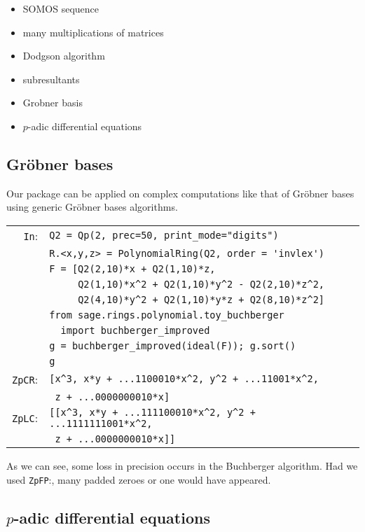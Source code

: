 \documentclass[sigconf]{acmart}
\newcommand{\cIn}{{\color{blue} \tt \phantom{Zp}In}:}
\newcommand{\cZpCR}{{\color{red} \tt ZpCR}:}
\newcommand{\cZpFP}{{\color{red} \tt ZpFP}:}
\newcommand{\cZpLC}{{\color{red} \tt ZpLC}:}
\theoremstyle{definition}
\begin{document}
\begin{itemize}
\item SOMOS sequence
\item many multiplications of matrices
\item Dodgson algorithm
\item subresultants
\item Grobner basis
\item $p$-adic differential equations
\end{itemize}

\subsection{Gröbner bases}
Our package can be applied 
on complex computations like that of
Gröbner bases using generic
Gröbner bases algorithms.

\begin{tabular}{rl}
\cIn
 & \verb?Q2 = Qp(2, prec=50, print_mode="digits")? \\
 & \verb?R.<x,y,z> = PolynomialRing(Q2, order = 'invlex')? \\
 & \verb?F = [Q2(2,10)*x + Q2(1,10)*z, ? \\
 & \verb?     Q2(1,10)*x^2 + Q2(1,10)*y^2 - Q2(2,10)*z^2,? \\
 & \verb?     Q2(4,10)*y^2 + Q2(1,10)*y*z + Q2(8,10)*z^2]? \\
 & \verb?from sage.rings.polynomial.toy_buchberger?\\
 &\verb?  import buchberger_improved? \\
 & \verb?g = buchberger_improved(ideal(F)); g.sort()? \\
 & \verb?g? \\
\cZpCR
 & \verb?[x^3, x*y + ...1100010*x^2, y^2 + ...11001*x^2,? \\
 & \verb? z + ...0000000010*x]? \\
\cZpLC
 & \verb?[[x^3, x*y + ...111100010*x^2, y^2 + ...1111111001*x^2,? \\
 & \verb? z + ...0000000010*x]]? \\
\end{tabular}

As we can see, some loss in precision occurs in the
Buchberger algorithm.
Had we used \cZpFP , many padded zeroes or one would have appeared.

\subsection{$p$-adic differential equations}
\end{document}
